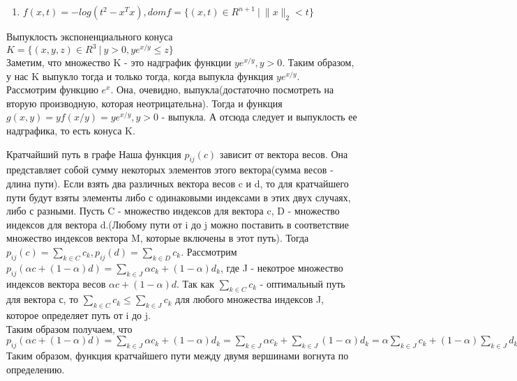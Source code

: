 \documentclass[12pt]{extreport}
\theoremstyle{definiton}
\theoremstyle{definition}
\theoremstyle{definition}
\let\leq\leqslant
\let\geq\geqslant
\def\prend{
	\medskip
}
\begin{document}
\begin{enumerate}
        \\ Сделаем замену, $g(t) = f(U+Vt),\ t\in R,\forall U,V:U+Vt\in dom(f)$ U должна быть положительно определенной, иначе при t=0 аргумент не будет положительно определенной матрицей, а V - симметричной.
        \\$g(t) = trace((U+Vt)^{-1}) = trace((I+U^{-1}Vt)^{-1}U^{-1})$
        \\$(I+U^{-1}Vt)^{-1}U^{-1} = (I-tU^{-1}V+t^2(U^{-1}V)^2-t^3(U^{-1}V)^3+...)U^{-1}=U^{-1}-tU^{-1}VU^{-1}+t^2(U^{-1}V)^2U^{-1}$
        \\ Рассмотрим вторую производную g(t):$g''(t) = 2trace((U^{-1}V)^2U^{-1} -6t(U^{-1}V)^3U^{-1}+...)$
        \\ $g''(0) = 2trace(U^{-1}VU^{-1}VU^{-1})=2trace(CU^{-1}C^T), C=U^{-1}V$. Так как U - положительно определенная матрица, то и $CU^{-1}C^T$ положительно определенная, как подобная. Значит $2trace(CU^{-1}C^T) > 0$, и наша функция выпукла по критерию второго порядка.
        \item $f(x,t)= -log(t^2-x^Tx), domf = \{(x,t) \in R^{n+1}\ |\ \|x\|_2 < t\}$
    \end{enumerate}


	\PR[] Выпуклость экспоненциального конуса
	\\$K = \{(x,y,z) \in R^3\ |\ y > 0, ye^{x/y}\leq z \}$
	\\Заметим, что множество K - это надграфик функции $ye^{x/y},y>0$. Таким образом, у нас K выпукло тогда и только тогда, когда выпукла функция $ye^{x/y}$. 
	\\Рассмотрим функцию $e^x$. Она, очевидно, выпукла(достаточно посмотреть на вторую производную, которая неотрицательна). Тогда и функция $g(x,y) = yf(x/y) = ye^{x/y},y>0$ - выпукла. А отсюда следует и выпуклость ее надграфика, то есть конуса K.
	\prend
    
    \PR[] Кратчайший путь в графе
    Наша функция $p_{ij}(c)$ зависит от вектора весов. Она представляет собой сумму некоторых элементов этого вектора(сумма весов - длина пути). Если взять два различных вектора весов c и d, то для кратчайшего пути будут взяты элементы либо с одинаковыми индексами в этих двух случаях, либо с разными. Пусть C - множество индексов для вектора c, D - множество индексов для вектора d.(Любому пути от i до j можно поставить в соответствие множество индексов вектора M, которые включены в этот путь). Тогда $p_{ij}(c)=\sum_{k\in C}c_k, p_{ij}(d)=\sum_{k\in D}c_k$. Рассмотрим $p_{ij}(\alpha c + (1-\alpha)d)=\sum_{k\in J}\alpha c_k + (1-\alpha)d_k$, где J - некотрое множество индексов вектора весов $\alpha c + (1-\alpha)d$. Так как $\sum_{k\in C}c_k$ - оптимальный путь для вектора с, то $\sum_{k\in C}c_k \leq \sum_{k\in J}c_k$ для любого множества индексов J, которое определяет путь от i до j. 
    \\Таким образом получаем, что $p_{ij}(\alpha c + (1-\alpha)d)=\sum_{k\in J}\alpha c_k + (1-\alpha)d_k = \sum_{k\in J}\alpha c_k + \sum_{k\in J}(1-\alpha)d_k = \alpha\sum_{k\in J}c_k + (1-\alpha)\sum_{k\in J}d_k \geq \alpha\sum_{k\in C}c_k + (1-\alpha)\sum_{k\in D}d_k = \alpha p_{ij}(c) + (1-\alpha)p_{ij}(d)$
    \\ Таким образом, функция кратчайшего пути между двумя вершинами вогнута по определению. 
    \prend
    
\end{document}

